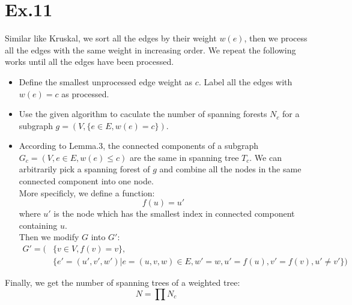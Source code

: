 	\section{Ex.11}
		Similar like Kruskal, we sort all the edges by their weight $w(e)$, then we process all the edges with the same weight in increasing order. We repeat the following works until all the edges have been processed.
		\begin{itemize}
			\item Define the smallest unprocessed edge weight as $c$. Label all the edges with $w(e)=c$ as processed.
			\item Use the given algorithm to caculate the number of spanning forests $N_c$ for a subgraph $g=(V,\{e\in E,w(e)=c\})$.
			\item According to Lemma.3, the connected components of a subgraph $G_c=(V,{e\in E,w(e)\leq c})$ are the same in spanning tree $T_c$. We can arbitrarily pick a spanning forest of $g$ and combine all the nodes in the same connected component into one node.\\
			More specificly, we define a function: $$f(u)=u'$$ where $u'$ is the node which has the smallest index in connected component containing $u$.\\ Then we modify $G$ into $G'$:
			\begin{align*}
				G'=(&\{v\in V,f(v)=v\},\\
				&\{e'=(u',v',w')|e=(u,v,w)\in E,w'=w,u'=f(u),v'=f(v),u'\neq v'\})
			\end{align*}
		\end{itemize}
		Finally, we get the number of spanning trees of a weighted tree:
		$$N=\prod N_c$$